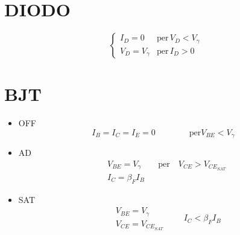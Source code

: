\documentclass{article}
\begin{document}
\section*{DIODO}
\begin{minipage}{0.4\textwidth}
\end{minipage}
\begin{minipage}{0.5\textwidth}
    \[
    \begin{cases}
        I_D = 0 & \text{per} \, V_D < V_\gamma\\
        V_D = V_\gamma & \text{per}\, I_D > 0
    \end{cases}
    \]
\end{minipage}



\section*{BJT}
\begin{minipage}{0.4\textwidth}
\end{minipage}
\begin{minipage}{0.5\textwidth}
    \begin{itemize}
        \item OFF
            \[ I_B = I_C = I_E = 0 \qquad\qquad \text{per} V_{BE} < V_\gamma \]

        \item AD
            \[
                \begin{aligned}
                    &V_{BE} = V_\gamma \qquad \text{per}\quad V_{CE} > V_{CE_{SAT}}\\
                    &I_C = \beta_F I_B
                \end{aligned}
            \]
        \item SAT
            \[
                \begin{aligned}
                &V_{BE} = V_\gamma \\
                &V_{CE} = V_{CE_{SAT}}
                \end{aligned} \qquad I_C < \beta_F I_B
            \]
    \end{itemize}
\end{minipage}
\end{document}
